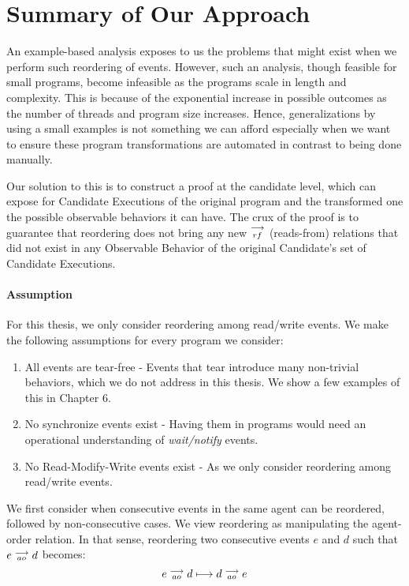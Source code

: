 \section{Summary of Our Approach}

    An example-based analysis exposes to us the problems that might exist when we perform such reordering of events. 
    However, such an analysis, though feasible for small programs, become infeasible as the programs scale in length and complexity. 
    This is because of the exponential increase in possible outcomes as the number of threads and program size increases. 
    Hence, generalizations by using a small examples is not something we can afford especially when we want to ensure these program transformations are automated in contrast to being done manually.
    
    Our solution to this is to construct a proof at the candidate level, which can expose for Candidate Executions of the original program and the transformed one the possible observable behaviors it can have.   
    The crux of the proof is to guarantee that reordering does not bring any new $\stackrel{\longrightarrow}{_{rf}}$ (reads-from) relations that did not exist in any Observable Behavior of the original Candidate's set of Candidate Executions. 
    
    \paragraph{Assumption}
    For this thesis, we only consider reordering among read/write events.
    We make the following assumptions for every program we consider:
    \begin{enumerate}
        \item All events are tear-free - Events that tear introduce many non-trivial behaviors, which we do not address in this thesis. We show a few examples of this in Chapter 6.
        \item No synchronize events exist - Having them in programs would need an operational understanding of \textit{wait/notify} events. 
        \item No Read-Modify-Write events exist - As we only consider reordering among read/write events.
    \end{enumerate}
    
    We first consider when consecutive events in the same agent can be reordered, followed by non-consecutive cases. 
    We view reordering as manipulating the agent-order relation. 
    In that sense, reordering two consecutive events $e$ and $d$ such that $e \stackrel{\longrightarrow}{_{ao}} d$ becomes:
    \[
        e \stackrel{\longrightarrow}{_{ao}} d 
        \longmapsto
        d \stackrel{\longrightarrow}{_{ao}} e 
    \]

